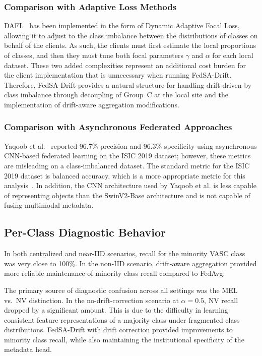 \documentclass{ieeeaccess}
\newcommand{\sadrift}{FedSA-Drift}
\begin{document}
\subsubsection{Comparison with Adaptive Loss Methods}

DAFL~\cite{Zhao2025} has been implemented in the form of Dynamic Adaptive Focal Loss, allowing it to adjust to the class imbalance between the distributions of classes on behalf of the clients. As such, the clients must first estimate the local proportions of classes, and then they must tune both focal parameters $\gamma$ and $\alpha$ for each local dataset. These two added complexities represent an additional cost burden for the client implementation that is unnecessary when running \sadrift{}. Therefore, \sadrift{} provides a natural structure for handling drift driven by class imbalance through decoupling of Group~C at the local site and the implementation of drift-aware aggregation modifications.

\subsubsection{Comparison with Asynchronous Federated Approaches}

Yaqoob et al.~\cite{Yaqoob2023} reported 96.7\% precision and 96.3\% specificity using asynchronous CNN-based federated learning on the ISIC 2019 dataset; however, these metrics are misleading on a class-imbalanced dataset. The standard metric for the ISIC 2019 dataset is balanced accuracy, which is a more appropriate metric for this analysis~\cite{Gessert2020}. In addition, the CNN architecture used by Yaqoob et al. is less capable of representing objects than the SwinV2-Base architecture and is not capable of fusing multimodal metadata.

\subsection{Per-Class Diagnostic Behavior}

In both centralized and near-IID scenarios, recall for the minority VASC class was very close to 100\%. In the non-IID scenario, drift-aware aggregation provided more reliable maintenance of minority class recall compared to FedAvg.

The primary source of diagnostic confusion across all settings was the MEL vs.\ NV distinction. In the no-drift-correction scenario at $\alpha{=}0.5$, NV recall dropped by a significant amount. This is due to the difficulty in learning consistent feature representations of a majority class under fragmented class distributions. \sadrift{} with drift correction provided improvements to minority class recall, while also maintaining the institutional specificity of the metadata head.
\end{document}
